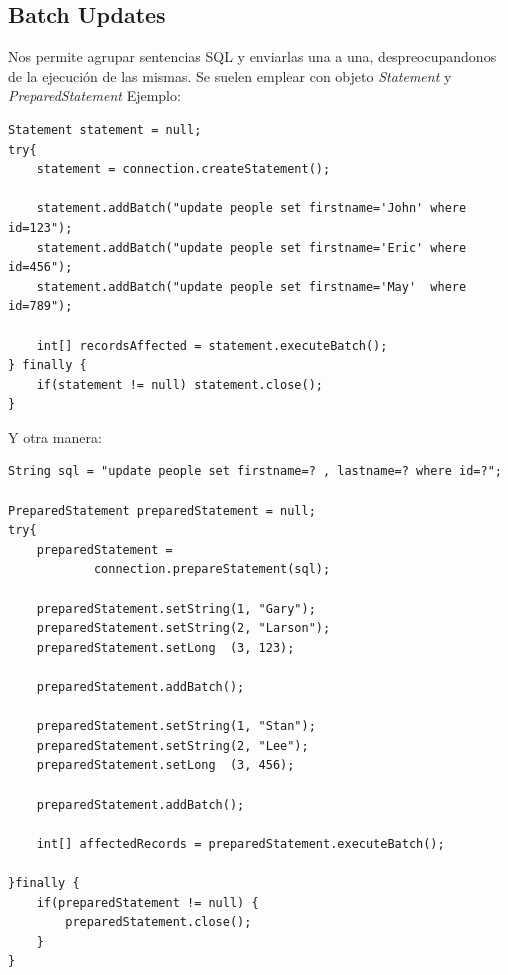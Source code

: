 \documentclass[4paper]{article}
\begin{document}
\subsection{Batch Updates}
Nos permite agrupar sentencias SQL y enviarlas una a una, despreocupandonos de la ejecución de las mismas. Se suelen emplear con objeto \emph{Statement} y \emph{PreparedStatement}
Ejemplo:
\newpage
\begin{lstlisting}
Statement statement = null;
try{
    statement = connection.createStatement();

    statement.addBatch("update people set firstname='John' where id=123");
    statement.addBatch("update people set firstname='Eric' where id=456");
    statement.addBatch("update people set firstname='May'  where id=789");

    int[] recordsAffected = statement.executeBatch();
} finally {
    if(statement != null) statement.close();
}
\end{lstlisting}
Y otra manera:
\begin{lstlisting}
String sql = "update people set firstname=? , lastname=? where id=?";

PreparedStatement preparedStatement = null;
try{
    preparedStatement =
            connection.prepareStatement(sql);

    preparedStatement.setString(1, "Gary");
    preparedStatement.setString(2, "Larson");
    preparedStatement.setLong  (3, 123);

    preparedStatement.addBatch();

    preparedStatement.setString(1, "Stan");
    preparedStatement.setString(2, "Lee");
    preparedStatement.setLong  (3, 456);

    preparedStatement.addBatch();

    int[] affectedRecords = preparedStatement.executeBatch();

}finally {
    if(preparedStatement != null) {
        preparedStatement.close();
    }
}
\end{lstlisting}
\end{document}
